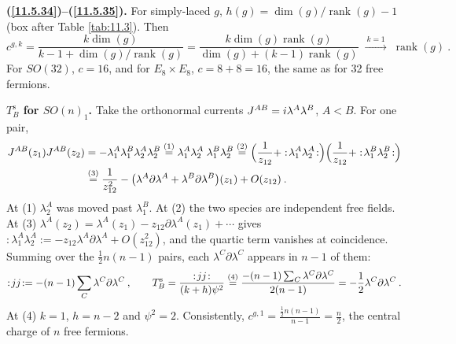 \begin{tcolorbox}[breakable]
	\begin{remark}
		\textbf{(\ref{11.5.34})--(\ref{11.5.35}).} For simply-laced $g$, $h(g)=\operatorname{dim}(g)/\operatorname{rank}(g)-1$ (box after Table \ref{tab:11.3}). Then
		\begin{equation*}
			c^{g,k}=\frac{k\operatorname{dim}(g)}{k-1+\operatorname{dim}(g)/\operatorname{rank}(g)}
			=\frac{k\operatorname{dim}(g)\operatorname{rank}(g)}{\operatorname{dim}(g)+(k-1)\operatorname{rank}(g)}
			\;\xrightarrow{\ k=1\ }\;\operatorname{rank}(g)\:.
		\end{equation*}
		For $SO(32)$, $c=16$, and for $E_{8}\times E_{8}$, $c=8+8=16$, the same as for 32 free fermions.

		\textbf{$T^{\mathrm{s}}_{B}$ for $SO(n)_{1}$.} Take the orthonormal currents $J^{AB}=i\lambda^{A}\lambda^{B}$, $A<B$. For one pair,
		\begin{align*}
			J^{AB}(z_{1})J^{AB}(z_{2})&=-\lambda^{A}_{1}\lambda^{B}_{1}\lambda^{A}_{2}\lambda^{B}_{2}
			\overset{(1)}{=}\lambda^{A}_{1}\lambda^{A}_{2}\;\lambda^{B}_{1}\lambda^{B}_{2}
			\overset{(2)}{=}\Bigl(\frac{1}{z_{12}}+:\!\lambda^{A}_{1}\lambda^{A}_{2}\!:\Bigr)\Bigl(\frac{1}{z_{12}}+:\!\lambda^{B}_{1}\lambda^{B}_{2}\!:\Bigr)\\
			&\overset{(3)}{=}\frac{1}{z_{12}^{2}}-\bigl(\lambda^{A}\partial\lambda^{A}+\lambda^{B}\partial\lambda^{B}\bigr)(z_{1})+O(z_{12})\:.
		\end{align*}
		At (1) $\lambda^{A}_{2}$ was moved past $\lambda^{B}_{1}$. At (2) the two species are independent free fields. At (3) $\lambda^{A}(z_{2})=\lambda^{A}(z_{1})-z_{12}\partial\lambda^{A}(z_{1})+\cdots$ gives $:\!\lambda^{A}_{1}\lambda^{A}_{2}\!:=-z_{12}\lambda^{A}\partial\lambda^{A}+O(z_{12}^{2})$, and the quartic term vanishes at coincidence. Summing over the $\frac{1}{2}n(n-1)$ pairs, each $\lambda^{C}\partial\lambda^{C}$ appears in $n-1$ of them:
		\begin{equation*}
			:\!jj\!:=-(n-1)\sum_{C}\lambda^{C}\partial\lambda^{C}\:,\qquad
			T^{\mathrm{s}}_{B}=\frac{:\!jj\!:}{(k+h)\psi^{2}}\overset{(4)}{=}\frac{-(n-1)\sum_{C}\lambda^{C}\partial\lambda^{C}}{2(n-1)}=-\frac{1}{2}\lambda^{C}\partial\lambda^{C}\:.
		\end{equation*}
		At (4) $k=1$, $h=n-2$ and $\psi^{2}=2$. Consistently, $c^{g,1}=\frac{\frac{1}{2}n(n-1)}{n-1}=\frac{n}{2}$, the central charge of $n$ free fermions.
	\end{remark}
\end{tcolorbox}


